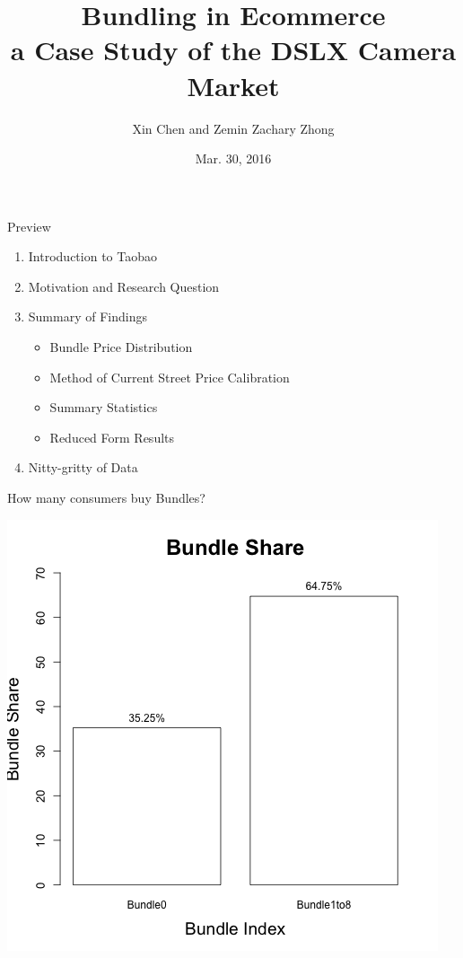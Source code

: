 \documentclass[xcolor=dvipsnames,12pt]{beamer}
\title[Bundling]{ Bundling in Ecommerce\\ a Case Study of the DSLX Camera Market}
\author[Chen and Zhong]{Xin Chen and Zemin Zachary Zhong}
\institute[UC Berkeley - Haas]{University of California -- Berkeley}
\date{Mar. 30, 2016}
\theoremstyle{definition}
\begin{document}
\begin{frame}
\titlepage
\end{frame}


\begin{frame}{Preview}
	\begin{enumerate}
		\item Introduction to Taobao
		\item Motivation and Research Question
		\item Summary of Findings
		\begin{itemize}
		\item Bundle Price Distribution
		\item Method of Current Street Price Calibration
		\item Summary Statistics
		\item Reduced Form Results
		\end{itemize}
		\item Nitty-gritty of Data
	\end{enumerate}
\end{frame}

{
\begin{center}





\end{center}
}

\begin{frame}{How many consumers buy Bundles?}
	\graphicspath{ {./graph_share/} }
	\centering
	\includegraphics[scale=0.48]{Avg_Bundle_Share1}
\end{frame}
\end{document}
